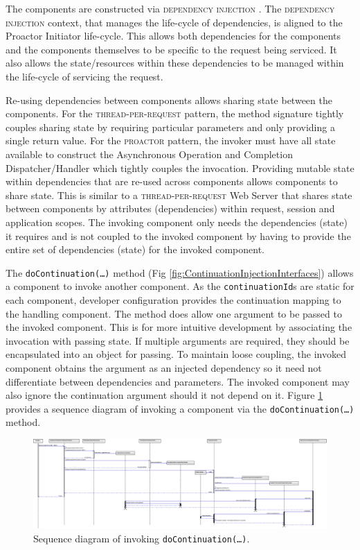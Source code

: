 \documentclass[prodmode]{style/acmlarge}
\begin{document}
The components are constructed via \textsc{dependency injection} \cite{ioc}. The
\textsc{dependency injection} context, that manages the life-cycle of
dependencies, is aligned to the Proactor Initiator life-cycle.
This allows both dependencies for the components and the components themselves
to be specific to the request being serviced.  It also allows the
state/resources within these dependencies to be managed within the life-cycle of
servicing the request.

Re-using dependencies between components allows sharing state between the
components.  For the \textsc{thread-per-request} pattern, the method signature
tightly couples sharing state by requiring particular parameters and only
providing a single return value.  For the \textsc{proactor} pattern, the invoker
must have all state available to construct the Asynchronous Operation and
Completion Dispatcher/Handler which tightly couples the invocation.  Providing
mutable state within dependencies that are re-used across components allows
components to share state.  This is similar to a \textsc{thread-per-request} Web
Server that shares state between components by attributes (dependencies) within
request, session and application scopes.  The invoking component only needs the
dependencies (state) it requires and is not coupled to the invoked component by
having to provide the entire set of dependencies (state) for the invoked
component.

The \texttt{doContinuation(\ldots)} method (Fig
\ref{fig:ContinuationInjectionInterfaces}) allows a component to invoke another
component.  As the \texttt{continuationId}s are static for each component,
developer configuration provides the continuation mapping to the handling
component.  The method does allow one argument to be passed to the invoked
component.  This is for more intuitive development by associating the invocation
with passing state.  If multiple arguments are required, they should be
encapsulated into an object for passing.  To maintain loose coupling, the
invoked component obtains the argument as an injected dependency so it need not
differentiate between dependencies and parameters.  The invoked component may
also ignore the continuation argument should it not depend on it.  Figure
\ref{fig:DoContinuationSequenceDiagram} provides a sequence diagram of invoking
a component via the \texttt{doContinuation(\ldots)} method.
  
\begin{figure}[!t]
\centering
\includegraphics[width=6in]{DoContinuationSequenceDiagram}
\caption{Sequence diagram of invoking \texttt{doContinuation(\ldots)}.}
\label{fig:DoContinuationSequenceDiagram}
\end{figure}
 
\end{document}
